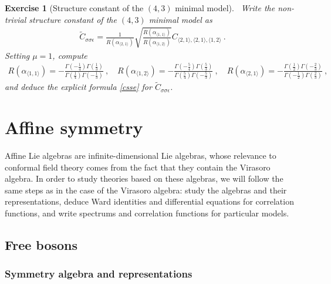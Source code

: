 \documentclass[12pt, a4paper, notitlepage, twoside]{report}
\numberwithin{equation}{section}
\theoremstyle{break}
\newtheorem{exo}{Exercise}[chapter]
\begin{document}
\begin{exo}[Structure constant of the $(4,3)$ minimal model]
 ~\label{exocsse}
Write the non-trivial structure constant of the $(4,3)$ minimal model as
\begin{align}
 \tilde{C}_{\sigma\sigma\epsilon} = \frac{1}{R(\alpha_{\langle 2,1 \rangle})}\sqrt{\frac{R(\alpha_{\langle 1,1 \rangle})}{R(\alpha_{\langle 1,2 \rangle})}} C_{\langle 2,1\rangle , \langle 2,1 \rangle,\langle 1,2 \rangle}\ .
\end{align}
Setting $\mu=1$, compute
\begin{align}
 R(\alpha_{\langle 1,1 \rangle}) = -\frac{\Gamma(-\frac14)\Gamma(\frac13)}{\Gamma(\frac14)\Gamma(-\frac13)} \ , \quad R(\alpha_{\langle 1,2 \rangle}) = -\frac{\Gamma(-\frac54)\Gamma(\frac53)}{\Gamma(\frac54)\Gamma(-\frac53)} \ , \quad R(\alpha_{\langle 2,1 \rangle}) = -\frac{\Gamma(\frac12)\Gamma(-\frac23)}{\Gamma(-\frac12)\Gamma(\frac23)}\ ,
\end{align}
and deduce the explicit formula \eqref{csse} for $\tilde{C}_{\sigma\sigma\epsilon}$.
\end{exo}


\chapter{Affine symmetry \label{secaff}}

Affine Lie algebras are infinite-dimensional Lie algebras, whose relevance to conformal field theory comes from the fact that they contain the Virasoro algebra.
In order to study theories based on these algebras, we will follow the same steps as in the case of the Virasoro algebra: study the algebras and their representations, deduce Ward identities and differential equations for correlation functions, and write spectrums and correlation functions for particular models. 

\section{Free bosons}

\subsection{Symmetry algebra and representations \label{secaua}}
\end{document}
